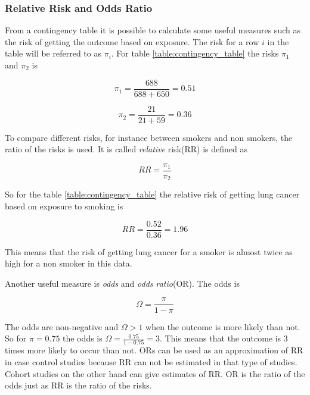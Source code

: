 \documentclass[10pt,a4paper]{report}
\begin{document}
\subsubsection{Relative Risk and Odds Ratio}
\label{rr_or}
From a contingency table it is possible to calculate some useful measures such as the risk of getting the outcome based on exposure. The risk for a row $i$ in the table will be referred to as $\pi_i$. For table \ref{table:contingency_table} the risks $\pi_1$ and $\pi_2$ is

\begin{equation}
\pi_1=\frac{688}{688+650}=0.51
\end{equation}

\begin{equation}
\pi_2=\frac{21}{21+59}=0.36
\end{equation}

To compare different risks, for instance between smokers and non smokers, the ratio of the risks is used\cite{agresti_categorical}. It is called \emph{relative} risk(RR) is defined as\cite{agresti_categorical} 

\begin{equation}
RR=\frac{\pi_1}{\pi_2}
\end{equation}

So for the table \ref{table:contingency_table} the relative risk of getting lung cancer based on exposure to smoking is

\begin{equation}
RR=\frac{0.52}{0.36}=1.96
\end{equation}

This means that the risk of getting lung cancer for a smoker is almost twice as high for a non smoker in this data.

Another useful measure is \emph{odds} and \emph{odds ratio}(OR). The odds is\cite{agresti_categorical} 

\begin{equation}\label{eq:odds}
\Omega=\frac{\pi}{1-\pi}
\end{equation}

The odds are non-negative and $\Omega>1$ when the outcome is more likely than not\cite{agresti_categorical}. So for $\pi=0.75$ the odds is $\Omega=\frac{0.75}{1-0.75}=3$. This means that the outcome is 3 times more likely to occur than not. ORs can be used as an approximation of RR in case control studies because RR can not be estimated in that type of studies\cite{or_mislead}. Cohort studies on the other hand can give estimates of RR\cite{or_mislead}. OR is the ratio of the odds just as RR is the ratio of the risks\cite{agresti_categorical}.
\end{document}
